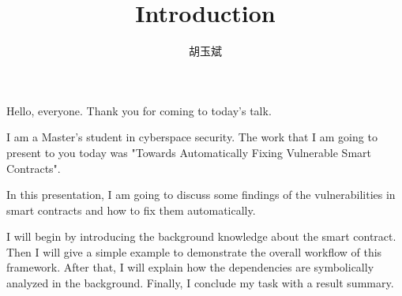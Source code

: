 \documentclass[onecolumn,oneside]{BUPTHomework}
\author{胡玉斌}
\title{Introduction}
\begin{document}
  \maketitle

Hello, everyone. Thank you for coming to today's talk.

I am a Master's student in cyberspace security. The work that I am going to present to you today was  "Towards Automatically Fixing Vulnerable Smart Contracts". 

In this presentation, I am going to discuss some findings of the vulnerabilities in smart contracts and how to fix them automatically. 

I will begin by introducing the background knowledge about the smart contract. Then I will give a simple example to demonstrate the overall workflow of this framework. After that, I will explain how the dependencies are symbolically analyzed in the background. Finally, I conclude my task with a result summary.
  
\end{document}
